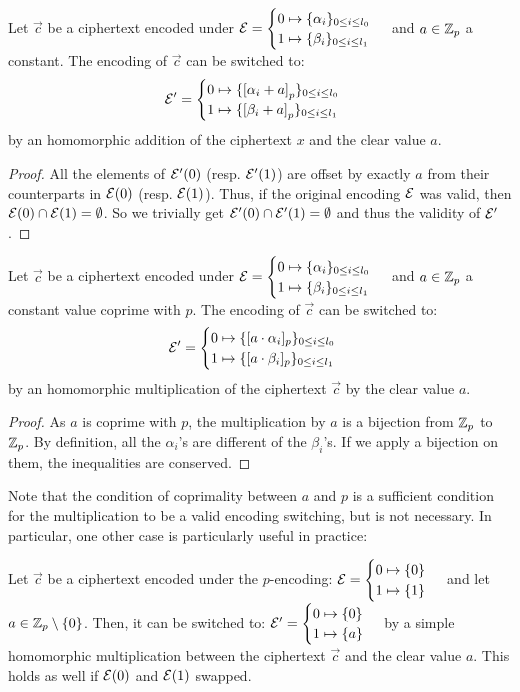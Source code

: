 \begin{property}
    \label{prop:sum_constant}
    Let $\vec c$ be a ciphertext encoded under $\mathcal{E} = \begin{cases} 0 \mapsto \{\alpha_i\}_{0 \le i \le l_0} \\ 1 \mapsto \{\beta_i\}_{0 \le i \le l_1} \end{cases} $ and $a \in \mathbb{Z}_p$ a constant. The encoding of $\vec c$ can be switched to:
    \[\mathcal{E}' = \begin{cases} 0 \mapsto \{\left [ \alpha_i + a \right ]_{p}\}_{0 \le i \le l_0} \\ 1 \mapsto \{\left [ \beta_i + a \right ]_{p}\}_{0 \le i \le l_1} \end{cases}\] by an homomorphic addition of the ciphertext $x$ and the clear value $a$. 
\end{property}

\begin{proof}
    All the elements of $\mathcal{E}'(0)$ (resp. $\mathcal{E}'(1)$) are offset by exactly $a$ from their counterparts in $\mathcal{E}(0)$ (resp. $\mathcal{E}(1)$). Thus, if the original encoding $\mathcal{E}$ was valid, then $\mathcal{E}(0) \cap \mathcal{E}(1) = \emptyset$. So we trivially get  $\mathcal{E}'(0) \cap \mathcal{E}'(1) = \emptyset$ and thus the validity of $\mathcal{E}'$.
\end{proof}


\begin{property}
    \label{prop:mult_constant}
    Let $\vec c$ be a ciphertext encoded under $\mathcal{E} = \begin{cases} 0 \mapsto \{\alpha_i\}_{0 \le i \le l_0} \\ 1 \mapsto \{\beta_i\}_{0 \le i \le l_1} \end{cases} $ and $a \in \mathbb{Z}_p$ a constant value coprime with $p$. The encoding of $\vec c$ can be switched to:
    \[\mathcal{E}' = \begin{cases} 0 \mapsto \{[a \cdot \alpha_i]_p\}_{0 \le i \le l_0} \\ 1 \mapsto \{[a \cdot \beta_i]_p\}_{0 \le i \le l_1} \end{cases}\]
    by an homomorphic multiplication of the ciphertext $\vec c$ by the clear value $a$.
\end{property}
\begin{proof}
As $a$ is coprime with $p$, the multiplication by $a$ is a bijection from $\mathbb{Z}_p$ to $\mathbb{Z}_p$. By definition, all the $\alpha_i$'s are different of the $\beta_i$'s. If we apply a bijection on them, the inequalities are conserved.
\end{proof}

Note that the condition of coprimality between $a$ and $p$ is a sufficient condition for the multiplication to be a valid encoding switching, but is not necessary. In particular, one other case is particularly useful in practice:

\begin{property}
\label{prop:mult_from_1}
    Let $\vec c$ be a ciphertext encoded under the $p$-encoding: $\mathcal{E} = \begin{cases} 0 \mapsto \{0\} \\ 1 \mapsto \{1\} \end{cases}$ and let $a \in \mathbb{Z}_p \setminus \{0\}$. Then, it can be switched to: $\mathcal{E}' = \begin{cases} 0 \mapsto \{0\} \\ 1 \mapsto \{a\} \end{cases}$ by a simple homomorphic multiplication between the ciphertext $\vec c$ and the clear value $a$.
    This holds as well if $\mathcal{E}(0)$ and $\mathcal{E}(1)$ swapped.
\end{property}

